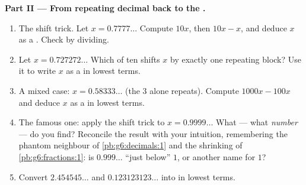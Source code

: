 \begin{problem}
\medskip
\noindent\textbf{Part II --- From repeating decimal back to the
.}
\begin{enumerate}[resume]
  \item The shift trick. Let $x = 0.7777\ldots$ Compute $10x$,
        then $10x - x$, and deduce $x$ as a . Check by
        dividing.
  \item Let $x = 0.727272\ldots$ Which  of ten shifts $x$ by
        exactly one repeating block? Use it to write $x$ as a
         in lowest terms.
  \item A mixed case: $x = 0.58333\ldots$ (the $3$ alone
        repeats). Compute $1000x - 100x$ and deduce $x$ as a
         in lowest terms.
  \item The famous one: apply the shift trick to
        $x = 0.9999\ldots$ What  --- what \emph{number}
        --- do you find? Reconcile the result with your
        intuition, remembering the phantom neighbour of
        \cref{pb:g6:decimals:1} and the shrinking  of
        \cref{pb:g6:fractions:1}: is $0.999\ldots$ ``just below''
        $1$, or another name for $1$?
  \item Convert $2.454545\ldots$ and $0.123123123\ldots$ into
         in lowest terms.
\end{enumerate}


\end{problem}
